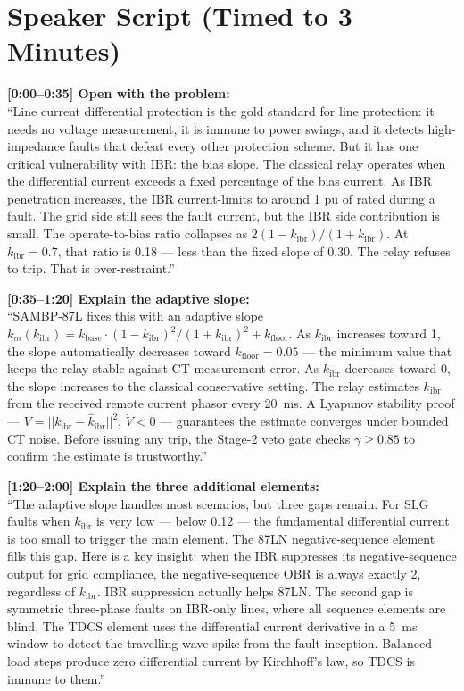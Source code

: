 \documentclass[12pt,a4paper]{article}
\begin{document}
\section{Speaker Script (Timed to 3 Minutes)}

\begin{speakbox}
\textbf{[0:00--0:35] Open with the problem:}\\
``Line current differential protection is the gold standard for line protection: it needs no voltage measurement, it is immune to power swings, and it detects high-impedance faults that defeat every other protection scheme. But it has one critical vulnerability with IBR: the bias slope. The classical relay operates when the differential current exceeds a fixed percentage of the bias current. As IBR penetration increases, the IBR current-limits to around 1 pu of rated during a fault. The grid side still sees the fault current, but the IBR side contribution is small. The operate-to-bias ratio collapses as $2(1-k_\mathrm{ibr})/(1+k_\mathrm{ibr})$. At $k_\mathrm{ibr} = 0.7$, that ratio is 0.18 --- less than the fixed slope of 0.30. The relay refuses to trip. That is over-restraint.''

\textbf{[0:35--1:20] Explain the adaptive slope:}\\
``SAMBP-87L fixes this with an adaptive slope $k_m(k_\mathrm{ibr}) = k_\mathrm{base} \cdot (1-k_\mathrm{ibr})^2/(1+k_\mathrm{ibr})^2 + k_\mathrm{floor}$. As $k_\mathrm{ibr}$ increases toward 1, the slope automatically decreases toward $k_\mathrm{floor} = 0.05$ --- the minimum value that keeps the relay stable against CT measurement error. As $k_\mathrm{ibr}$ decreases toward 0, the slope increases to the classical conservative setting. The relay estimates $k_\mathrm{ibr}$ from the received remote current phasor every 20~ms. A Lyapunov stability proof --- $V = ||k_\mathrm{ibr} - \hat{k}_\mathrm{ibr}||^2$, $\dot{V} < 0$ --- guarantees the estimate converges under bounded CT noise. Before issuing any trip, the Stage-2 veto gate checks $\gamma \geq 0.85$ to confirm the estimate is trustworthy.''

\textbf{[1:20--2:00] Explain the three additional elements:}\\
``The adaptive slope handles most scenarios, but three gaps remain. For SLG faults when $k_\mathrm{ibr}$ is very low --- below 0.12 --- the fundamental differential current is too small to trigger the main element. The 87LN negative-sequence element fills this gap. Here is a key insight: when the IBR suppresses its negative-sequence output for grid compliance, the negative-sequence OBR is always exactly 2, regardless of $k_\mathrm{ibr}$. IBR suppression actually helps 87LN. The second gap is symmetric three-phase faults on IBR-only lines, where all sequence elements are blind. The TDCS element uses the differential current derivative in a 5~ms window to detect the travelling-wave spike from the fault inception. Balanced load steps produce zero differential current by Kirchhoff's law, so TDCS is immune to them.''


\end{speakbox}
\end{document}
